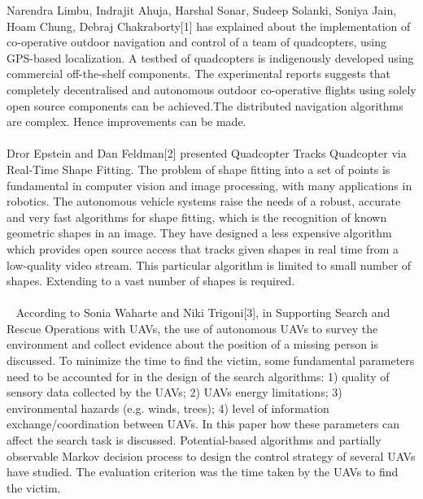 \documentclass[12pt,a4paper]{report}
\begin{document}
\hspace*{1cm} Narendra Limbu, Indrajit Ahuja, Harshal Sonar, Sudeep Solanki, Soniya Jain, Hoam Chung, Debraj Chakraborty[1] has explained about the implementation of co-operative outdoor navigation and control of a team of quadcopters, using GPS-based localization. A testbed of quadcopters is indigenously developed using commercial off-the-shelf components.  The experimental  reports suggests that completely decentralised and autonomous outdoor co-operative flights using solely open source components can be achieved.The distributed navigation algorithms are complex. Hence improvements can be made.  \\
 \\
 \hspace*{1cm}Dror Epstein and Dan Feldman[2] presented  Quadcopter Tracks Quadcopter via Real-Time Shape Fitting. The problem of shape fitting into a set of points is fundamental in computer vision and image processing, with many applications in robotics. The autonomous vehicle  systems raise the needs of a robust, accurate and very fast algorithms for shape fitting, which is the recognition of known geometric shapes in an image. They have designed a less expensive algorithm which provides open source access that tracks given shapes in real time from a low-quality video stream. This particular algorithm is limited to small number of shapes. Extending to a vast number of shapes is required.
\\\\\
\hspace*{1cm}
According to Sonia Waharte and Niki Trigoni[3], in Supporting Search and Rescue Operations with UAVs, the use of autonomous UAVs to survey the environment and collect evidence about the position of a missing person is discussed. To minimize the time to find the victim, some fundamental parameters need to be accounted for in the design of the search
algorithms: 1) quality of sensory data collected by the UAVs; 2)
UAVs energy limitations; 3) environmental hazards (e.g. winds,
trees); 4) level of information exchange/coordination between
UAVs. In this paper how these parameters can affect
the search task is discussed. Potential-based algorithms and partially
observable Markov decision process to design the control
strategy of several UAVs have studied. The evaluation criterion was the time
taken by the UAVs to find the victim.\\\
\end{document}
